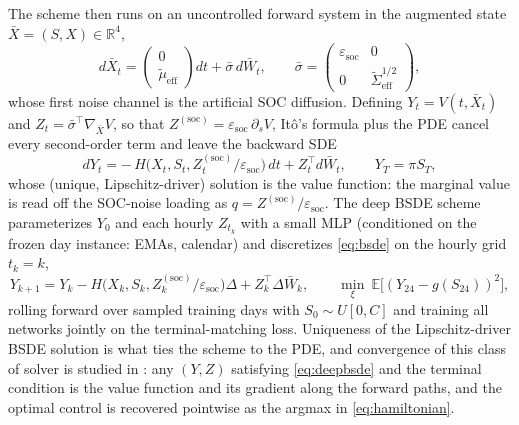 \documentclass[11pt]{article}
\begin{document}
The scheme then runs on an uncontrolled forward system in the
augmented state $\bar X = (S, X) \in \mathbb{R}^4$,
\begin{equation}
d\bar X_t = \begin{pmatrix} 0 \\ \tilde\mu_{\text{eff}} \end{pmatrix} dt
+ \bar\sigma \, d\bar W_t, \qquad
\bar\sigma = \begin{pmatrix} \varepsilon_{\text{soc}} & 0 \\
0 & \tilde\Sigma_{\text{eff}}^{1/2} \end{pmatrix},
\label{eq:forward}
\end{equation}
whose first noise channel is the artificial SOC diffusion. Defining
$Y_t = V(t,\bar X_t)$ and $Z_t = \bar\sigma^\top \nabla_{\bar X} V$, so
that $Z^{(\text{soc})} = \varepsilon_{\text{soc}}\,\partial_s V$, It\^o's formula plus the PDE
cancel every second-order term and leave the backward SDE
\begin{equation}
dY_t = -\,H\big(X_t, S_t, Z^{(\text{soc})}_t/\varepsilon_{\text{soc}}\big)\,dt
+ Z_t^\top d\bar W_t, \qquad Y_T = \pi S_T,
\label{eq:bsde}
\end{equation}
whose (unique, Lipschitz-driver) solution is the value function:
the marginal value is read off the SOC-noise loading as
$q = Z^{(\text{soc})}/\varepsilon_{\text{soc}}$. The deep BSDE scheme parameterizes $Y_0$ and each hourly $Z_{t_k}$ with a
small MLP (conditioned on the frozen day instance: EMAs, calendar) and
discretizes \eqref{eq:bsde} on the hourly grid $t_k = k$,
\begin{equation}
Y_{k+1} = Y_k - H\big(X_k, S_k, Z^{(\text{soc})}_k/\varepsilon_{\text{soc}}\big)\Delta
+ Z_k^\top \Delta\bar W_k, \qquad
\min_\xi\ \mathbb{E}\big[(Y_{24} - g(S_{24}))^2\big],
\label{eq:deepbsde}
\end{equation}
rolling forward over sampled training days with $S_0 \sim U[0, C]$ and
training all networks jointly on the terminal-matching loss. Uniqueness of
the Lipschitz-driver BSDE solution \cite{pardoux1990} is what ties the
scheme to the PDE, and convergence of this class of solver is studied in
\cite{hanlong2020}: any
$(Y, Z)$ satisfying \eqref{eq:deepbsde} and the terminal condition
is the value function and its gradient along the forward paths, and
the optimal control is recovered pointwise as the argmax in
\eqref{eq:hamiltonian}.
\end{document}
